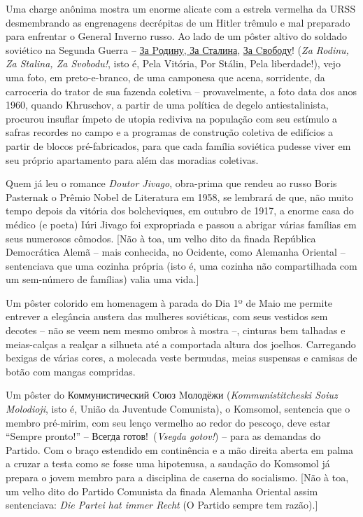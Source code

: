 Uma charge anônima mostra um enorme alicate com a estrela vermelha da
URSS desmembrando as engrenagens decrépitas de um Hitler trêmulo e mal
preparado para enfrentar o General Inverno russo. Ao lado de um pôster
altivo do soldado soviético na Segunda Guerra --
\href{http://s30974892118.mirtesen.ru/blog/43698046687/Kedmi:-Za-Rodinu,-za-Stalina!}{За
Pодину, За Сталина},
\href{https://demotivators.to/p/129524/za-otvagu-za-chest-za-rodinu-za-svobodu.htm}{За
Cвободу}! (\emph{Za Rodinu, Za Stalina, Za Svobodu!}, isto é, Pela
Vitória, Por Stálin, Pela liberdade!), vejo uma foto, em preto-e-branco,
de uma camponesa que acena, sorridente, da carroceria do trator de sua
fazenda coletiva -- provavelmente, a foto data dos anos 1960, quando
Khruschov, a partir de uma política de degelo antiestalinista, procurou
insuflar ímpeto de utopia rediviva na população com seu estímulo a
safras recordes no campo e a programas de construção coletiva de
edifícios a partir de blocos pré-fabricados, para que cada família
soviética pudesse viver em seu próprio apartamento para além das
moradias coletivas.

Quem já leu o romance \emph{Doutor Jivago}, obra-prima que rendeu ao
russo Boris Pasternak o Prêmio Nobel de Literatura em 1958, se lembrará
de que, não muito tempo depois da vitória dos bolcheviques, em outubro
de 1917, a enorme casa do médico (e poeta) Iúri Jivago foi expropriada e
passou a abrigar várias famílias em seus numerosos cômodos. {[}Não à
toa, um velho dito da finada República Democrática Alemã -- mais
conhecida, no Ocidente, como Alemanha Oriental -- sentenciava que uma
cozinha própria (isto é, uma cozinha não compartilhada com um sem-número
de famílias) valia uma vida.{]}

Um pôster colorido em homenagem à parada do Dia 1º de Maio me permite
entrever a elegância austera das mulheres soviéticas, com seus vestidos
sem decotes -- não se veem nem mesmo ombros à mostra --, cinturas bem
talhadas e meias-calças a realçar a silhueta até a comportada altura dos
joelhos. Carregando bexigas de várias cores, a molecada veste bermudas,
meias suspensas e camisas de botão com mangas compridas.

Um pôster do Коммунистический Cоюз Mолодёжи (\emph{Kommunistitcheski
Soiuz Molodioji}, isto é, União da Juventude Comunista), o Komsomol,
sentencia que o membro pré-mirim, com seu lenço vermelho ao redor do
pescoço, deve estar ``Sempre pronto!'' -- Всегда готов!~(\emph{Vsegda
gotov!}) -- para as demandas do Partido. Com o braço estendido em
continência e a mão direita aberta em palma a cruzar a testa como se
fosse uma hipotenusa, a saudação do Komsomol já prepara o jovem membro
para a disciplina de caserna do socialismo. {[}Não à toa, um velho dito
do Partido Comunista da finada Alemanha Oriental assim sentenciava:
\emph{Die Partei hat immer Recht} (O Partido sempre tem razão).{]}

